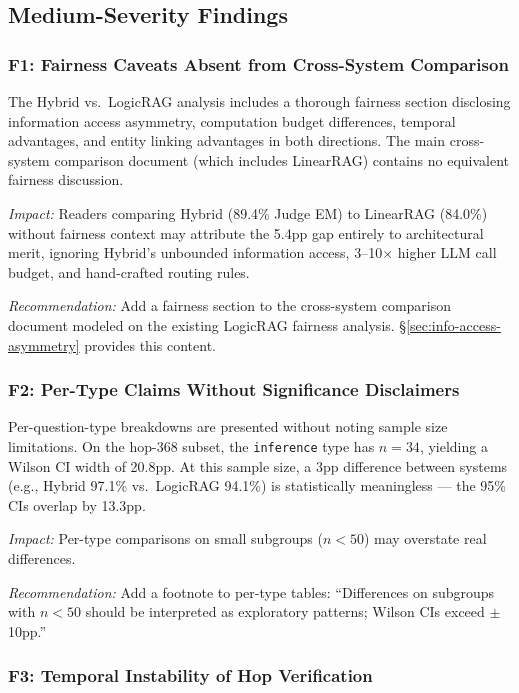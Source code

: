 \subsection{Medium-Severity Findings}
\label{sec:medium-findings}

\subsubsection{F1: Fairness Caveats Absent from Cross-System Comparison}

The Hybrid vs.\ LogicRAG analysis includes a thorough fairness section disclosing information access asymmetry, computation budget differences, temporal advantages, and entity linking advantages in both directions. The main cross-system comparison document (which includes LinearRAG) contains no equivalent fairness discussion.

\textit{Impact:} Readers comparing Hybrid (89.4\% Judge EM) to LinearRAG (84.0\%) without fairness context may attribute the 5.4pp gap entirely to architectural merit, ignoring Hybrid's unbounded information access, 3--10$\times$ higher LLM call budget, and hand-crafted routing rules.

\textit{Recommendation:} Add a fairness section to the cross-system comparison document modeled on the existing LogicRAG fairness analysis. \S\ref{sec:info-access-asymmetry} provides this content.

\subsubsection{F2: Per-Type Claims Without Significance Disclaimers}

Per-question-type breakdowns are presented without noting sample size limitations. On the hop-368 subset, the \texttt{inference} type has $n=34$, yielding a Wilson CI width of 20.8pp. At this sample size, a 3pp difference between systems (e.g., Hybrid 97.1\% vs.\ LogicRAG 94.1\%) is statistically meaningless --- the 95\% CIs overlap by 13.3pp.

\textit{Impact:} Per-type comparisons on small subgroups ($n < 50$) may overstate real differences.

\textit{Recommendation:} Add a footnote to per-type tables: ``Differences on subgroups with $n < 50$ should be interpreted as exploratory patterns; Wilson CIs exceed $\pm$10pp.''

\subsubsection{F3: Temporal Instability of Hop Verification}

